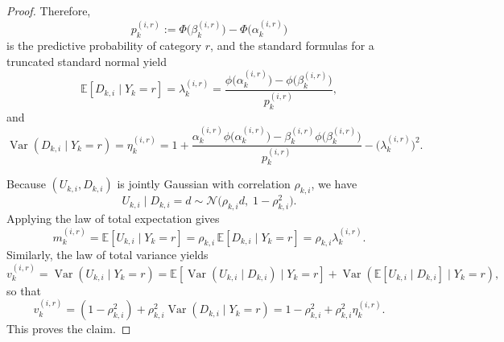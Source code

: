 \documentclass{article}
\begin{document}
\begin{proof}
Therefore,
\begin{equation*}
p_k^{(i,r)}:=\Phi\!\bigl(\beta_k^{(i,r)}\bigr)-\Phi\!\bigl(\alpha_k^{(i,r)}\bigr)
\end{equation*}
is the predictive probability of category $r$, and the standard formulas for a
truncated standard normal yield
\begin{equation*}
\mathbb E[D_{k,i}\mid Y_k=r]
=
\lambda_k^{(i,r)}
=
\frac{\phi\!\bigl(\alpha_k^{(i,r)}\bigr)-\phi\!\bigl(\beta_k^{(i,r)}\bigr)}{p_k^{(i,r)}},
\end{equation*}
and
\begin{equation*}
\operatorname{Var}(D_{k,i}\mid Y_k=r)
=
\eta_k^{(i,r)}
=
1+
\frac{\alpha_k^{(i,r)}\phi\!\bigl(\alpha_k^{(i,r)}\bigr)
-\beta_k^{(i,r)}\phi\!\bigl(\beta_k^{(i,r)}\bigr)}{p_k^{(i,r)}}
-\bigl(\lambda_k^{(i,r)}\bigr)^2.
\end{equation*}

Because $(U_{k,i},D_{k,i})$ is jointly Gaussian with correlation $\rho_{k,i}$, we
have
\begin{equation*}
U_{k,i}\mid D_{k,i}=d
\sim
\mathcal N\!\bigl(\rho_{k,i}d,\;1-\rho_{k,i}^2\bigr).
\end{equation*}
Applying the law of total expectation gives
\begin{equation*}
m_k^{(i,r)}
=
\mathbb E[U_{k,i}\mid Y_k=r]
=
\rho_{k,i}\,\mathbb E[D_{k,i}\mid Y_k=r]
=
\rho_{k,i}\lambda_k^{(i,r)}.
\end{equation*}
Similarly, the law of total variance yields
\begin{equation*}
v_k^{(i,r)}
=
\operatorname{Var}(U_{k,i}\mid Y_k=r)
=
\mathbb E\!\left[\operatorname{Var}(U_{k,i}\mid D_{k,i})\mid Y_k=r\right]
+
\operatorname{Var}\!\left(\mathbb E[U_{k,i}\mid D_{k,i}]\mid Y_k=r\right),
\end{equation*}
so that
\begin{equation*}
v_k^{(i,r)}
=
(1-\rho_{k,i}^2)+\rho_{k,i}^2\operatorname{Var}(D_{k,i}\mid Y_k=r)
=
1-\rho_{k,i}^2+\rho_{k,i}^2\eta_k^{(i,r)}.
\end{equation*}
This proves the claim.
\end{proof}
\newpage
\end{document}
